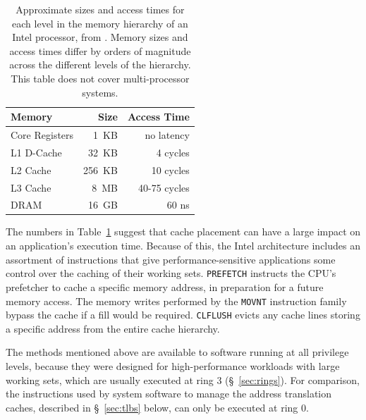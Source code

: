 
\begin{table}[hbt]
  \centering
  \begin{tabular}{| l | r | r |}
  \hline
  \textbf{Memory} & \textbf{Size} & \textbf{Access Time}\\
  \hline
  Core Registers & 1~KB & no latency \\
  \hline
  L1 D-Cache & 32~KB & 4 cycles \\
  \hline
  L2 Cache & 256~KB & 10 cycles \\
  \hline
  L3 Cache & 8~MB & 40-75 cycles \\
  \hline
  DRAM & 16~GB & 60 ns \\
  \hline
  \end{tabular}
  \caption{
    Approximate sizes and access times for each level in the memory
    hierarchy of an Intel processor, from \cite{intel2010perfanalysis}. Memory
    sizes and access times differ by orders of magnitude across the different
    levels of the hierarchy. This table does not cover multi-processor systems.
  }
  \label{fig:cache_timings}
\end{table}


The numbers in Table~\ref{fig:cache_timings} suggest that cache placement can
have a large impact on an application's execution time. Because of this, the
Intel architecture includes an assortment of instructions that give
performance-sensitive applications some control over the caching of their
working sets. \texttt{PREFETCH} instructs the CPU's prefetcher to cache a
specific memory address, in preparation for a future memory access. The memory
writes performed by the \texttt{MOVNT} instruction family bypass the cache if a
fill would be required. \texttt{CLFLUSH} evicts any cache lines storing a
specific address from the entire cache hierarchy.

The methods mentioned above are available to software running at all privilege
levels, because they were designed for high-performance workloads with large
working sets, which are usually executed at ring 3 (\S~\ref{sec:rings}). For
comparison, the instructions used by system software to manage the address
translation caches, described in \S~\ref{sec:tlbs} below, can only be executed
at ring 0.


